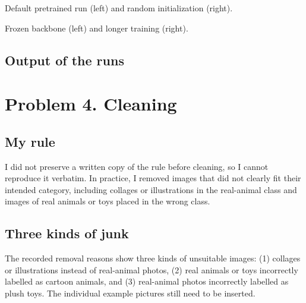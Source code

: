 \documentclass[11pt]{article}
\begin{document}
\begin{center}
\hfill
{}

\small Default pretrained run (left) and random initialization (right).
\end{center}

\begin{center}
\hfill
{}

\small Frozen backbone (left) and longer training (right).
\end{center}

\subsection*{Output of the runs}

\section*{Problem 4. Cleaning}

\subsection*{My rule}
I did not preserve a written copy of the rule before cleaning, so I cannot reproduce it verbatim. In practice, I removed images that did not clearly fit their intended category, including collages or illustrations in the real-animal class and images of real animals or toys placed in the wrong class.

\subsection*{Three kinds of junk}
The recorded removal reasons show three kinds of unsuitable images: (1) collages or illustrations instead of real-animal photos, (2) real animals or toys incorrectly labelled as cartoon animals, and (3) real-animal photos incorrectly labelled as plush toys. The individual example pictures still need to be inserted.

\end{document}

